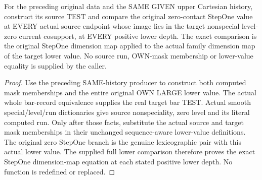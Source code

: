 \begin{theorem}
\label{hir:original-given-upper-cartesian-zero-stepone-values}
\leanok
For the preceding original data and the SAME GIVEN upper Cartesian history,
construct its source TEST and compare the original zero-contact StepOne
value at EVERY actual source endpoint whose image lies in the target
nonspecial level-zero current cosupport, at EVERY positive lower depth.
The exact comparison is the original StepOne dimension map applied to the
actual family dimension map of the target lower value. No source run,
OWN-mask membership or lower-value equality is supplied by the caller.
\end{theorem}
\begin{proof}
Use the preceding SAME-history producer to construct both computed mask
memberships and the entire original OWN LARGE lower value. The actual
whole bar-record equivalence supplies the real target bar TEST. Actual
smooth special/level/run dictionaries give source nonspeciality, zero
level and its literal computed run. Only after those facts, substitute the
actual source and target mask memberships in their unchanged sequence-aware
lower-value definitions. The original zero StepOne branch is the genuine
lexicographic pair with this actual lower value. The supplied full lower
comparison therefore proves the exact StepOne dimension-map equation at
each stated positive lower depth. No function is redefined or replaced.
\end{proof}

